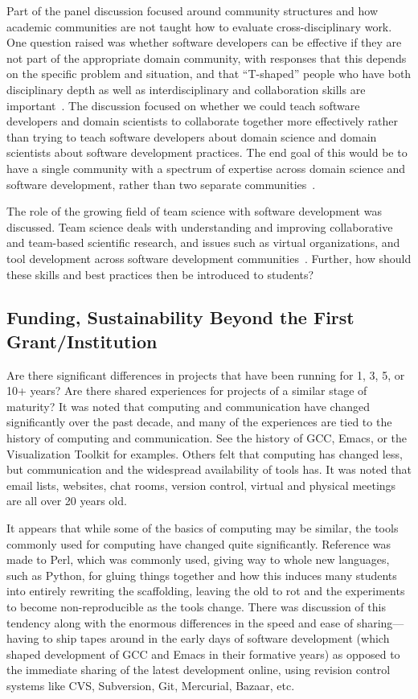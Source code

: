 \documentclass[11pt, oneside]{amsart}
\begin{document}
Part of the panel discussion focused around community structures and
how academic communities are not taught how to evaluate
cross-disciplinary work. One question raised was whether software
developers can be effective if they are not part of the appropriate
domain community, with responses that this depends on the specific
problem and situation, and that ``T-shaped'' people who have both
disciplinary depth as well as interdisciplinary and collaboration
skills are important~\cite{Trainer_WSSSPE, Dubey_WSSSPE, Girotto_WSSSPE}.
The discussion focused on whether we could
teach software developers and domain scientists to collaborate
together more effectively rather than trying to teach software
developers about domain science and domain scientists about software
development practices. The end goal of this would be to have a single
community with a spectrum of expertise across domain science and
software development, rather than two separate communities~\cite{Prlic_WSSSPE}.

The role of the growing field of team science with software
development was discussed. Team science deals with understanding and
improving collaborative and team-based scientific research, and issues
such as virtual organizations, and tool development across software
development communities~\cite{Christopherson_WSSSPE, Cranston_WSSSPE}.
Further, how should these skills and best practices then be introduced to students?

\subsection{Funding, Sustainability Beyond the First Grant/Institution}

Are there significant differences in projects that have been running
for 1, 3, 5, or 10+ years? Are there shared experiences for projects
of a similar stage of maturity? It was noted that computing and
communication have changed significantly over the past decade, and
many of the experiences are tied to the history of computing and
communication. See the history of GCC, Emacs, or the Visualization
Toolkit for examples. Others felt that computing has changed less, but
communication and the widespread availability of tools has. It was
noted that email lists, websites, chat rooms, version control, virtual
and physical meetings are all over 20 years old.

It appears that while some of the basics of computing may be
similar, the tools commonly used for computing have changed quite
significantly. Reference was made to Perl, which was commonly used,
giving way to whole new languages, such as Python, for gluing things
together and how this induces many students into entirely rewriting
the scaffolding, leaving the old to rot and the experiments to become
non-reproducible as the tools change. There was discussion of this
tendency along with the enormous differences in the speed and ease of
sharing---having to ship tapes around in the early days of software development
(which shaped development of GCC and Emacs in their formative years) as opposed to
the immediate sharing of the latest development online, using revision
control systems like CVS, Subversion, Git, Mercurial, Bazaar, etc.
\end{document}
